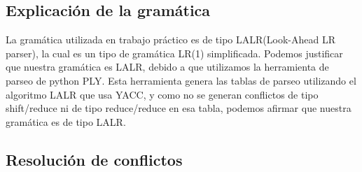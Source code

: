 \subsection{Explicación de la gramática}
La gramática utilizada en trabajo práctico es de tipo LALR(Look-Ahead LR
parser), la cual es un tipo de gramática LR(1) simplificada. Podemos justificar
que nuestra gramática es LALR, debido a que utilizamos la herramienta de
parseo de python PLY. Esta herramienta genera las tablas de parseo utilizando
el algoritmo LALR que usa YACC, y como no se generan conflictos de tipo
shift/reduce ni de tipo reduce/reduce en esa tabla, podemos afirmar que nuestra
gramática es de tipo LALR.

\subsection{Resolución de conflictos}

